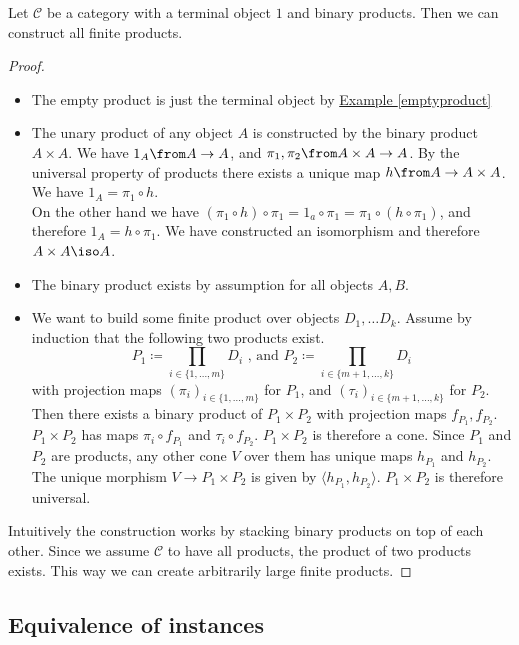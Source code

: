 \begin{lemma}
  \label{finiteproducts}
  Let $\mathscr C$ be a category with a terminal object $1$ and binary products.
  Then we can construct all finite products.
\end{lemma}
\begin{proof}
  \begin{itemize}
  \item The empty product is just the terminal object by
    \hyperref[emptyproduct]{Example \ref*{emptyproduct}}
  \item The unary product of any object $A$ is constructed by the binary product
    $A \times A$.
    We have $1_A \from A \to A$, and $\pi_1, \pi_2 \from A \times A \to A$.
    By the universal property of products there exists a unique map $h \from A \to A \times A$.
    We have $1_A = \pi_1 \circ h$.\\
    On the other hand we have $(\pi_1 \circ h) \circ \pi_1 = 1_a \circ \pi_1 = \pi_1 \circ ( h \circ \pi_1)$,
    and therefore $1_A = h \circ \pi_1$.
    We have constructed an isomorphism and therefore $A \times A \iso A$.
  \item The binary product exists by assumption for all objects $A, B$.
  \item We want to build some finite product over objects $D_1, \dots D_k$.
    Assume by induction that the following two products exist.
    \[ P_1 \coloneqq \displaystyle \prod_{i \in \{1, \dots, m \} } D_i \text{ , and } P_2 \coloneqq \displaystyle \prod_{i \in \{m+1, \dots, k\} } D_i \]
    with projection maps $(\pi_i)_{i \in \{1, \dots, m \} }$ for $P_1$, and $(\tau_i)_{i \in \{m+1, \dots, k\} }$ for $P_2$.
    Then there exists a binary product of $P_1 \times P_2$ with projection maps $f_{P_1}, f_{P_2}$.
    $P_1 \times P_2$ has maps $\pi_i \circ f_{P_1}$ and $\tau_i \circ f_{P_2}$.
    $P_1 \times P_2$ is therefore a cone.
    Since $P_1$ and $P_2$ are products, any other cone $V$ over them has unique maps $h_{P_1}$ and $h_{P_2}$.
    The unique morphism $V \rightarrow P_1 \times P_2$ is given by $\langle h_{P_1}, h_{P_2} \rangle$.
    $P_1 \times P_2$ is therefore universal.
  \end{itemize}
  Intuitively the construction works by stacking binary products on top of each other.
  Since we assume $\mathscr C$ to have all products, the product of two products exists. This way we can create
  arbitrarily large finite products.
\end{proof}

\subsection{Equivalence of instances}
\label{equiinstance}


